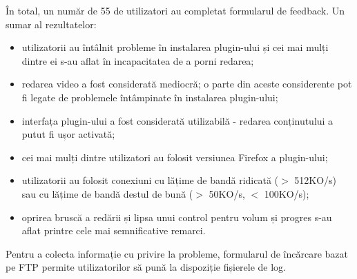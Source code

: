 În total, un număr de 55 de utilizatori au completat formularul de feedback.
Un sumar al rezultatelor:
\begin{itemize}
  \item utilizatorii au întâlnit probleme în instalarea plugin-ului și cei mai
  mulți dintre ei s-au aflat în incapacitatea de a porni redarea;
  \item redarea video a fost considerată mediocră; o parte din aceste considerente
  pot fi legate de problemele întâmpinate în instalarea plugin-ului;
  \item interfața plugin-ului a fost considerată utilizabilă - redarea conținutului
  a putut fi ușor activată;
  \item cei mai mulți dintre utilizatori au folosit versiunea Firefox a plugin-ului;
  \item utilizatorii au folosit conexiuni cu lățime de bandă ridicată ($>$ 512KO/s)
  sau cu lățime de bandă destul de bună ($>$ 50KO/s, $<$ 100KO/s);
  \item oprirea bruscă a redării și lipsa unui control pentru volum și progres s-au
  aflat printre cele mai semnificative remarci.
\end{itemize}

Pentru a colecta informație cu privire la probleme, formularul de încărcare
bazat pe FTP permite utilizatorilor să pună la dispoziție fișierele de log.


